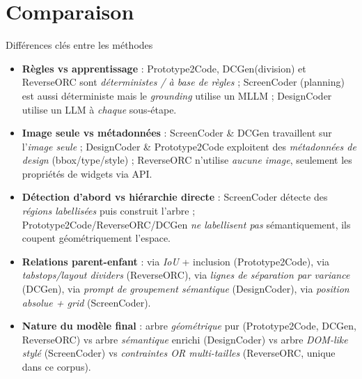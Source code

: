 \documentclass[10pt,aspectratio=169]{beamer}
\begin{document}
\section{Comparaison}
\begin{frame}{Différences clés entre les méthodes}
\begin{itemize}
  \item \textbf{Règles vs apprentissage} : Prototype2Code, DCGen(division) et ReverseORC sont \emph{déterministes / à base de règles} ; ScreenCoder (planning) est aussi déterministe mais le \emph{grounding} utilise un MLLM ; DesignCoder utilise un LLM à \emph{chaque} sous-étape.
  \item \textbf{Image seule vs métadonnées} : ScreenCoder \& DCGen travaillent sur l'\emph{image seule} ; DesignCoder \& Prototype2Code exploitent des \emph{métadonnées de design} (bbox/type/style) ; ReverseORC n'utilise \emph{aucune image}, seulement les propriétés de widgets via API.
  \item \textbf{Détection d'abord vs hiérarchie directe} : ScreenCoder détecte des \emph{régions labellisées} puis construit l'arbre ; Prototype2Code/ReverseORC/DCGen \emph{ne labellisent pas} sémantiquement, ils coupent géométriquement l'espace.
  \item \textbf{Relations parent-enfant} : via \emph{IoU} + inclusion (Prototype2Code), via \emph{tabstops/layout dividers} (ReverseORC), via \emph{lignes de séparation par variance} (DCGen), via \emph{prompt de groupement sémantique} (DesignCoder), via \emph{position absolue + grid} (ScreenCoder).
  \item \textbf{Nature du modèle final} : arbre \emph{géométrique} pur (Prototype2Code, DCGen, ReverseORC) vs arbre \emph{sémantique} enrichi (DesignCoder) vs arbre \emph{DOM-like stylé} (ScreenCoder) vs \emph{contraintes OR multi-tailles} (ReverseORC, unique dans ce corpus).
\end{itemize}
\end{frame}
\end{document}
